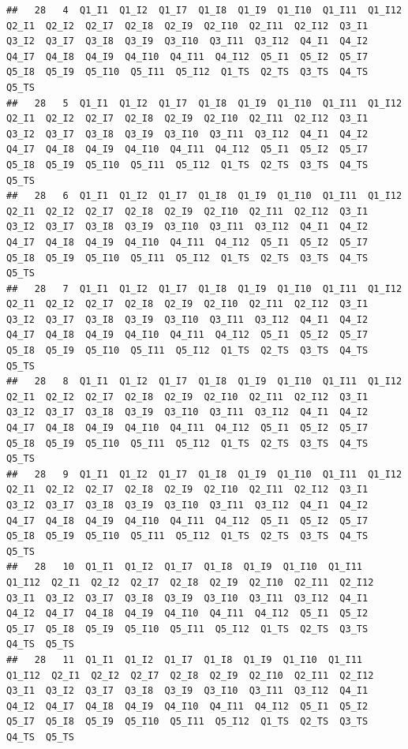 \documentclass[]{book}
\begin{document}
\begin{verbatim}
##   28   4  Q1_I1  Q1_I2  Q1_I7  Q1_I8  Q1_I9  Q1_I10  Q1_I11  Q1_I12  Q2_I1  Q2_I2  Q2_I7  Q2_I8  Q2_I9  Q2_I10  Q2_I11  Q2_I12  Q3_I1  Q3_I2  Q3_I7  Q3_I8  Q3_I9  Q3_I10  Q3_I11  Q3_I12  Q4_I1  Q4_I2  Q4_I7  Q4_I8  Q4_I9  Q4_I10  Q4_I11  Q4_I12  Q5_I1  Q5_I2  Q5_I7  Q5_I8  Q5_I9  Q5_I10  Q5_I11  Q5_I12  Q1_TS  Q2_TS  Q3_TS  Q4_TS  Q5_TS
##   28   5  Q1_I1  Q1_I2  Q1_I7  Q1_I8  Q1_I9  Q1_I10  Q1_I11  Q1_I12  Q2_I1  Q2_I2  Q2_I7  Q2_I8  Q2_I9  Q2_I10  Q2_I11  Q2_I12  Q3_I1  Q3_I2  Q3_I7  Q3_I8  Q3_I9  Q3_I10  Q3_I11  Q3_I12  Q4_I1  Q4_I2  Q4_I7  Q4_I8  Q4_I9  Q4_I10  Q4_I11  Q4_I12  Q5_I1  Q5_I2  Q5_I7  Q5_I8  Q5_I9  Q5_I10  Q5_I11  Q5_I12  Q1_TS  Q2_TS  Q3_TS  Q4_TS  Q5_TS
##   28   6  Q1_I1  Q1_I2  Q1_I7  Q1_I8  Q1_I9  Q1_I10  Q1_I11  Q1_I12  Q2_I1  Q2_I2  Q2_I7  Q2_I8  Q2_I9  Q2_I10  Q2_I11  Q2_I12  Q3_I1  Q3_I2  Q3_I7  Q3_I8  Q3_I9  Q3_I10  Q3_I11  Q3_I12  Q4_I1  Q4_I2  Q4_I7  Q4_I8  Q4_I9  Q4_I10  Q4_I11  Q4_I12  Q5_I1  Q5_I2  Q5_I7  Q5_I8  Q5_I9  Q5_I10  Q5_I11  Q5_I12  Q1_TS  Q2_TS  Q3_TS  Q4_TS  Q5_TS
##   28   7  Q1_I1  Q1_I2  Q1_I7  Q1_I8  Q1_I9  Q1_I10  Q1_I11  Q1_I12  Q2_I1  Q2_I2  Q2_I7  Q2_I8  Q2_I9  Q2_I10  Q2_I11  Q2_I12  Q3_I1  Q3_I2  Q3_I7  Q3_I8  Q3_I9  Q3_I10  Q3_I11  Q3_I12  Q4_I1  Q4_I2  Q4_I7  Q4_I8  Q4_I9  Q4_I10  Q4_I11  Q4_I12  Q5_I1  Q5_I2  Q5_I7  Q5_I8  Q5_I9  Q5_I10  Q5_I11  Q5_I12  Q1_TS  Q2_TS  Q3_TS  Q4_TS  Q5_TS
##   28   8  Q1_I1  Q1_I2  Q1_I7  Q1_I8  Q1_I9  Q1_I10  Q1_I11  Q1_I12  Q2_I1  Q2_I2  Q2_I7  Q2_I8  Q2_I9  Q2_I10  Q2_I11  Q2_I12  Q3_I1  Q3_I2  Q3_I7  Q3_I8  Q3_I9  Q3_I10  Q3_I11  Q3_I12  Q4_I1  Q4_I2  Q4_I7  Q4_I8  Q4_I9  Q4_I10  Q4_I11  Q4_I12  Q5_I1  Q5_I2  Q5_I7  Q5_I8  Q5_I9  Q5_I10  Q5_I11  Q5_I12  Q1_TS  Q2_TS  Q3_TS  Q4_TS  Q5_TS
##   28   9  Q1_I1  Q1_I2  Q1_I7  Q1_I8  Q1_I9  Q1_I10  Q1_I11  Q1_I12  Q2_I1  Q2_I2  Q2_I7  Q2_I8  Q2_I9  Q2_I10  Q2_I11  Q2_I12  Q3_I1  Q3_I2  Q3_I7  Q3_I8  Q3_I9  Q3_I10  Q3_I11  Q3_I12  Q4_I1  Q4_I2  Q4_I7  Q4_I8  Q4_I9  Q4_I10  Q4_I11  Q4_I12  Q5_I1  Q5_I2  Q5_I7  Q5_I8  Q5_I9  Q5_I10  Q5_I11  Q5_I12  Q1_TS  Q2_TS  Q3_TS  Q4_TS  Q5_TS
##   28   10  Q1_I1  Q1_I2  Q1_I7  Q1_I8  Q1_I9  Q1_I10  Q1_I11  Q1_I12  Q2_I1  Q2_I2  Q2_I7  Q2_I8  Q2_I9  Q2_I10  Q2_I11  Q2_I12  Q3_I1  Q3_I2  Q3_I7  Q3_I8  Q3_I9  Q3_I10  Q3_I11  Q3_I12  Q4_I1  Q4_I2  Q4_I7  Q4_I8  Q4_I9  Q4_I10  Q4_I11  Q4_I12  Q5_I1  Q5_I2  Q5_I7  Q5_I8  Q5_I9  Q5_I10  Q5_I11  Q5_I12  Q1_TS  Q2_TS  Q3_TS  Q4_TS  Q5_TS
##   28   11  Q1_I1  Q1_I2  Q1_I7  Q1_I8  Q1_I9  Q1_I10  Q1_I11  Q1_I12  Q2_I1  Q2_I2  Q2_I7  Q2_I8  Q2_I9  Q2_I10  Q2_I11  Q2_I12  Q3_I1  Q3_I2  Q3_I7  Q3_I8  Q3_I9  Q3_I10  Q3_I11  Q3_I12  Q4_I1  Q4_I2  Q4_I7  Q4_I8  Q4_I9  Q4_I10  Q4_I11  Q4_I12  Q5_I1  Q5_I2  Q5_I7  Q5_I8  Q5_I9  Q5_I10  Q5_I11  Q5_I12  Q1_TS  Q2_TS  Q3_TS  Q4_TS  Q5_TS

\end{verbatim}
\end{document}
